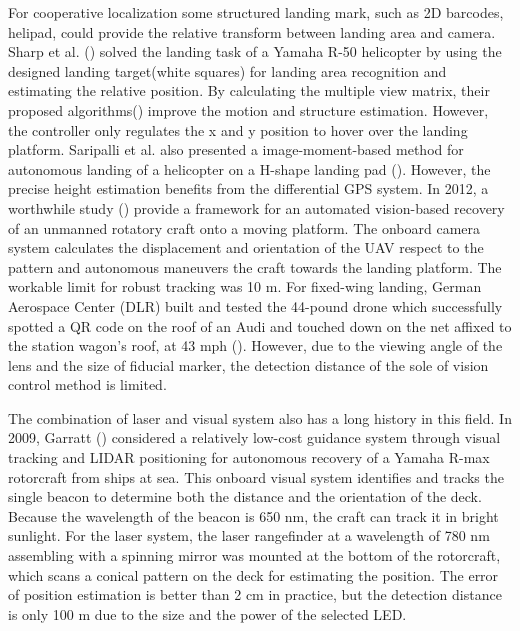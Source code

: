 For cooperative localization some structured landing mark, such as 2D barcodes, helipad, could provide the relative transform between landing area and camera. Sharp et al. (\cite{Sharp2001}) solved the landing task of a Yamaha R-50 helicopter by using the designed landing target(white squares) for landing area recognition and estimating the relative position. By calculating the multiple view matrix, their proposed algorithms(\cite{Shakernia2002}) improve the motion and structure estimation. However, the controller only regulates the x and y position to hover over the landing platform. Saripalli et al. also presented a image-moment-based method for autonomous landing of a helicopter on a H-shape landing pad (\cite{Saripalli2003}). However, the precise height estimation benefits from the differential GPS system. In 2012, a worthwhile study (\cite{richardsonautomated2013}) provide a framework for an automated vision-based recovery of an unmanned rotatory craft onto a moving platform. The onboard camera system calculates the displacement and orientation of the UAV respect to the pattern and autonomous maneuvers the craft towards the landing platform. The workable limit for robust tracking was 10 m. For fixed-wing landing, German Aerospace Center (DLR) built and tested the 44-pound drone which successfully spotted a QR code on the roof of an Audi and touched down on the net affixed to the station wagon’s roof, at 43 mph (\cite{DLR_Landing}). However, due to the viewing angle of the lens and the size of fiducial marker, the detection distance of the sole of vision control method is limited.



The combination of laser and visual system also has a long history in this field. In 2009, Garratt (\cite{garrattvisual2009}) considered a relatively low-cost guidance system through visual tracking and LIDAR positioning for autonomous recovery of a Yamaha R-max rotorcraft from ships at sea. This onboard visual system identifies and tracks the single beacon to determine both the distance and the orientation of the deck. Because the wavelength of the beacon is 650 nm, the craft can track it in bright sunlight. For the laser system, the laser rangefinder at a wavelength of 780 nm assembling with a spinning mirror was mounted at the bottom of the rotorcraft, which scans a conical pattern on the deck for estimating the position. The error of position estimation is better than 2 cm in practice, but the detection distance is only 100 m due to the size and the power of the selected LED. 

